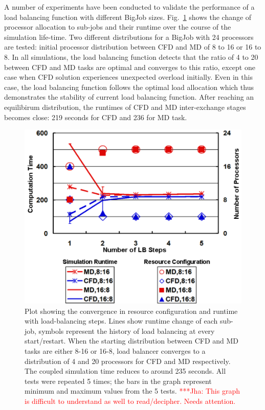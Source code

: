 \documentclass[conference,final]{IEEEtran}
\newcommand{\jhanote}[1]{ {\textcolor{red} { ***Jha: #1 }}}
\newcommand{\jhanote}[1]{}
\begin{document}
A number of experiments have been conducted to validate the performance of a load balancing function with different BigJob sizes.  Fig.~\ref{fig:LB_Graph} shows the change of processor allocation to sub-jobs and their runtime over the course of the simulation life-time.  Two different distributions for a BigJob with 24 processors are tested: initial processor distribution between CFD and MD of 8 to 16 or 16 to 8. In all simulations, the load balancing function detects that the ratio of 4 to 20 between CFD and MD tasks are optimal and converges to this ratio, except one case when CFD solution experiences unexpected overload initially. Even in this case, the load balancing function follows the optimal load allocation which thus demonstrates the stability of current load balancing function. After reaching an equilibirum distribution, the runtimes of CFD and MD inter-exchange stages becomes close: 219 seconds for CFD and 236 for MD task.

\begin{figure} \centering \includegraphics[scale=0.45]{LB_Graph2} \caption{\small Plot showing the convergence in resource configuration and runtime with load-balancing steps.  Lines show runtime change of each sub-job, symbols represent the history of load balancing at every start/restart. When the starting distribution between CFD and MD tasks are either 8-16 or 16-8, load balancer converges to a distribution of 4 and 20 processors for CFD and MD respectively. The coupled simulation time reduces to around 235 seconds. All tests were repeated 5 times; the bars in the graph represent minimum and maximum values from the 5 tests. \jhanote{This graph is difficult to understand as well to read/decipher. Needs attention.} } %
\label{fig:LB_Graph}
\end{figure}
\end{document}
